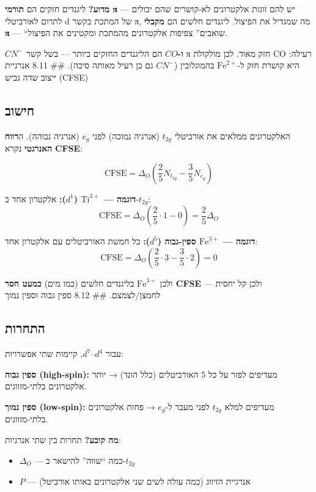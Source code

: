 \documentclass[
  hebrew,
  letterpaper,
  DIV=11,
  numbers=noendperiod]{scrreprt}
\providecommand{\tightlist}{%
  \setlength{\itemsep}{0pt}\setlength{\parskip}{0pt}}
\begin{document}
\textbf{מדוע?} ליגנדים חזקים הם \textbf{תורמי π} --- יש להם זוגות
אלקטרונים לא-קושרים שהם יכולים לתרום לאורביטלי d של המתכת בקשר π, מה
שמגדיל את הפיצול. ליגנדים חלשים הם \textbf{מקבלי π} --- ``שואבים''
צפיפות אלקטרונים מהמתכת ומקטינים את הפיצול.

\textbf{\(CN^-\) ו-\(CO\)} הם הליגנדים החזקים ביותר --- בשל קשר π חזק
מאוד. לכן מולקולת CO רעילה: היא קושרת חזק ל-\(\text{Fe}^{2+}\)
בהמוגלובין (\(CN^-\) גם כן רעיל מאותה סיבה). \#\# 8.11 אנרגיית ייצוב שדה
גביש (CFSE)

\subsection{חישוב}\label{ux5d7ux5d9ux5e9ux5d5ux5d1}

האלקטרונים ממלאים את אורביטלי \(t_{2g}\) (אנרגיה נמוכה) לפני \(e_g\)
(אנרגיה גבוהה). ה\textbf{רווח האנרגטי} נקרא \textbf{CFSE}:

\[\text{CFSE} = \Delta_O \left(\frac{2}{5} N_{t_{2g}} - \frac{3}{5} N_{e_g}\right)\]

\textbf{דוגמה --- \(\text{Ti}^{3+}\) (\(d^1\)):} אלקטרון אחד
ב-\(t_{2g}\):
\[\text{CFSE} = \Delta_O \left(\frac{2}{5} \cdot 1 - 0\right) = \frac{2}{5}\Delta_O\]

\textbf{דוגמה --- \(\text{Fe}^{3+}\) ספין-גבוה (\(d^5\)):} כל חמשת
האורביטלים עם אלקטרון אחד:
\[\text{CFSE} = \Delta_O\left(\frac{2}{5} \cdot 3 - \frac{3}{5} \cdot 2\right) = 0\]

ולכן \(\text{Fe}^{3+}\) בליגנדים חלשים (כמו מים) \textbf{כמעט חסר CFSE}
--- ולכן קל יחסית לחמצן/לצמצם. \#\# 8.12 ספין גבוה וספין נמוך

\subsection{התחרות}\label{ux5d4ux5eaux5d7ux5e8ux5d5ux5ea}

עבור \(d^4\)--\(d^7\), קיימות שתי אפשרויות:

\textbf{ספין גבוה (high-spin):} מעדיפים לפזר על כל 5 האורביטלים (כלל
הונד) → יותר אלקטרונים בלתי-מזווגים.

\textbf{ספין נמוך (low-spin):} מעדיפים למלא \(t_{2g}\) לפני מעבר
ל-\(e_g\) → פחות אלקטרונים בלתי-מזווגים.

\textbf{מה קובע?} תחרות בין שתי אנרגיות:

\begin{itemize}
\tightlist
\item
  \(\Delta_O\) --- כמה ``שווה'' להישאר ב-\(t_{2g}\)
\item
  \(P\) --- אנרגיית הזיווג (כמה עולה לשים שני אלקטרונים באותו אורביטל)
\end{itemize}
\end{document}

